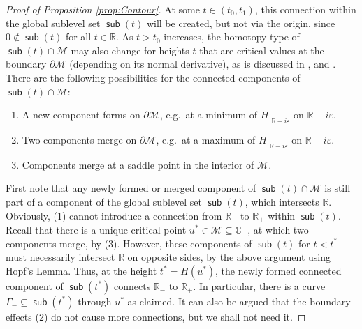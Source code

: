 \documentclass[reqno]{amsart}
\DeclareMathOperator{\sub}{\mathsf{sub}}
\newcommand{\1}{\mathbf{1}}
\newcommand{\C}{\mathbb{C}}
\newcommand{\R}{\mathbb{R}}
\def\R{\mathbb{R}}
\theoremstyle{plain}
\theoremstyle{definition}
\theoremstyle{remark}
\numberwithin{equation}{section}
\begin{document}
\begin{proof}[Proof of Proposition \ref{prop:Contour}]
	At some $t\in(t_0,t_1)$, this connection within the global sublevel set $\sub(t)$ will be created, but not via the origin, since $0\notin \sub(t)$ for all $t\in\R$. As $t>t_0$ increases, the homotopy type of $\sub(t)\cap \mathcal M$ may also change for heights $t$ that are critical values at the boundary $\partial \mathcal M$ (depending on its normal derivative), as is discussed in \cite[\S 1]{laudenbach}, \cite[p147]{braess} and \cite[\S 3]{Jan}. 
	There are the following possibilities for the connected components of $\sub(t)\cap \mathcal M$:
	\begin{enumerate}
		\item A new component forms on $\partial \mathcal M$, e.g.~at a minimum of $H|_{\R-i\varepsilon}$ on $\R-i\varepsilon$.
		\item Two components merge on $\partial \mathcal M$, e.g.~at a maximum of $H|_{\R-i\varepsilon}$ on $\R-i\varepsilon$.
		\item Components merge at a saddle point in the interior of $ \mathcal M$. 
	\end{enumerate}
	First note that any newly formed or merged component of $\sub(t)\cap \mathcal M$ is still part of a component of the global sublevel set $\sub(t)$, which intersects $\R$. 
	Obviously, (1) cannot introduce a connection from $\R_-$ to $\R_+$ within $\sub(t)$. Recall that there is a unique critical point $u^*\in\mathcal M\subseteq\C_-$, at which two components merge, by (3). However, these components of $\sub(t)$ for $t<t^*$ must necessarily intersect $\R$ on opposite sides, by the above argument using Hopf's Lemma. Thus, at the height $t^*=H(u^*)$, the newly formed connected component of $\sub(t^*)$ connects $\R_- $ to $\R_+ $. In particular, there is a curve $\Gamma_-\subseteq \sub(t^*)$ through $u^*$ as claimed. It can also be argued that the boundary effects (2) do not cause more connections, but we shall not need it.		

\end{proof}
\end{document}
